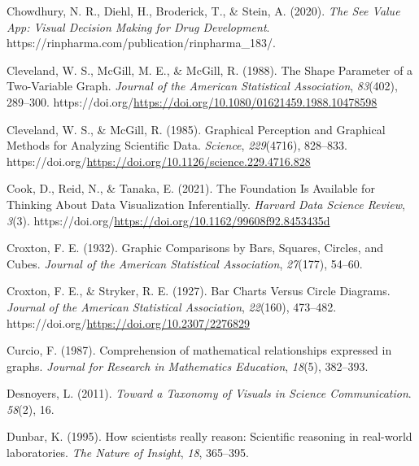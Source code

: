 \documentclass[
  10pt,
  letterpaper,
  DIV=11,
  numbers=noendperiod]{scrartcl}
\newlength{\cslhangindent}
\newenvironment{CSLReferences}[2] %
 {\begin{list}{}{%
  \setlength{\itemindent}{0pt}
  \setlength{\leftmargin}{0pt}
  \setlength{\parsep}{0pt}
  \ifodd #1
   \setlength{\leftmargin}{\cslhangindent}
   \setlength{\itemindent}{-1\cslhangindent}
  \fi
  \setlength{\itemsep}{#2\baselineskip}}}
 {\end{list}}
\begin{document}
\begin{CSLReferences}{1}{0}
Chowdhury, N. R., Diehl, H., Broderick, T., \& Stein, A. (2020).
\emph{The {See} {Value} {App}: {Visual} {Decision} {Making} for {Drug}
{Development}}. https://rinpharma.com/publication/rinpharma\_183/.

Cleveland, W. S., McGill, M. E., \& McGill, R. (1988). The {Shape}
{Parameter} of a {Two}-{Variable} {Graph}. \emph{Journal of the American
Statistical Association}, \emph{83}(402), 289--300.
https://doi.org/\url{https://doi.org/10.1080/01621459.1988.10478598}

Cleveland, W. S., \& McGill, R. (1985). Graphical {Perception} and
{Graphical} {Methods} for {Analyzing} {Scientific} {Data}.
\emph{Science}, \emph{229}(4716), 828--833.
https://doi.org/\url{https://doi.org/10.1126/science.229.4716.828}

Cook, D., Reid, N., \& Tanaka, E. (2021). The {Foundation} {Is}
{Available} for {Thinking} {About} {Data} {Visualization}
{Inferentially}. \emph{Harvard Data Science Review}, \emph{3}(3).
https://doi.org/\url{https://doi.org/10.1162/99608f92.8453435d}

Croxton, F. E. (1932). Graphic {Comparisons} by {Bars}, {Squares},
{Circles}, and {Cubes}. \emph{Journal of the American Statistical
Association}, \emph{27}(177), 54--60.

Croxton, F. E., \& Stryker, R. E. (1927). Bar {Charts} {Versus} {Circle}
{Diagrams}. \emph{Journal of the American Statistical Association},
\emph{22}(160), 473--482.
https://doi.org/\url{https://doi.org/10.2307/2276829}

Curcio, F. (1987). Comprehension of mathematical relationships expressed
in graphs. \emph{Journal for Research in Mathematics Education},
\emph{18}(5), 382--393.

Desnoyers, L. (2011). \emph{Toward a {Taxonomy} of {Visuals} in
{Science} {Communication}}. \emph{58}(2), 16.

Dunbar, K. (1995). How scientists really reason: {Scientific} reasoning
in real-world laboratories. \emph{The Nature of Insight}, \emph{18},
365--395.


\end{CSLReferences}
\end{document}
